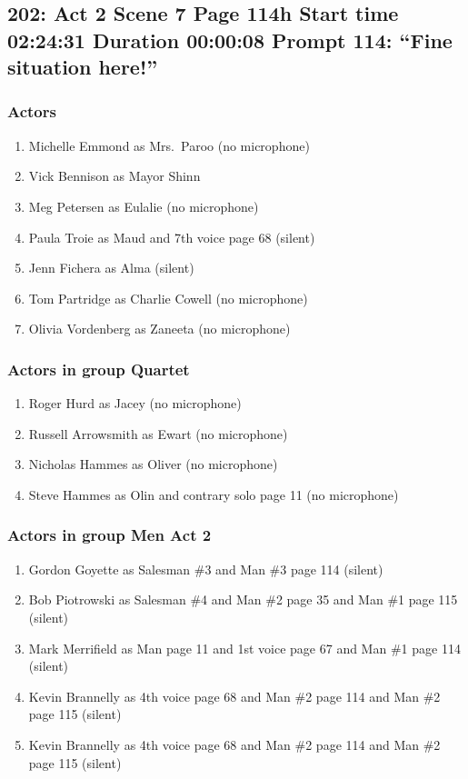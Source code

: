\subsection{202: Act 2 Scene 7 Page 114h Start time 02:24:31 Duration 00:00:08 Prompt 114: ``Fine situation here!''}

\subsubsection{Actors}
\begin{enumerate}
\item Michelle Emmond as Mrs.~Paroo (no microphone)
\item Vick Bennison as Mayor Shinn
\item Meg Petersen as Eulalie (no microphone)
\item Paula Troie as Maud and 7th voice page 68 (silent)
\item Jenn Fichera as Alma (silent)
\item Tom Partridge as Charlie Cowell (no microphone)
\item Olivia Vordenberg as Zaneeta (no microphone)
\end{enumerate}
\subsubsection{Actors in group Quartet}
\begin{enumerate}
\item Roger Hurd as Jacey (no microphone)
\item Russell Arrowsmith as Ewart (no microphone)
\item Nicholas Hammes as Oliver (no microphone)
\item Steve Hammes as Olin and contrary solo page 11 (no microphone)
\end{enumerate}
\subsubsection{Actors in group Men Act 2}
\begin{enumerate}
\item Gordon Goyette as Salesman \#3 and Man \#3 page 114 (silent)
\item Bob Piotrowski as Salesman \#4 and Man \#2 page 35 and Man \#1 page 115 (silent)
\item Mark Merrifield as Man page 11 and 1st voice page 67 and Man \#1 page 114 (silent)
\item Kevin Brannelly as 4th voice page 68 and Man \#2 page 114 and Man \#2 page 115 (silent)
\item Kevin Brannelly as 4th voice page 68 and Man \#2 page 114 and Man \#2 page 115 (silent)
\end{enumerate}
